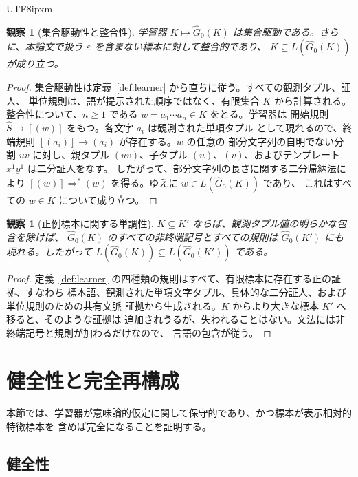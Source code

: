 \documentclass[10pt,a4paper]{article}
\newtheorem{observation}[theorem]{観察}
\theoremstyle{remark}
\newcommand{\eps}{\varepsilon}
\begin{document}
\begin{CJK}{UTF8}{ipxm}
\begin{observation}[集合駆動性と整合性]
\label{obs:set-driven-consistent}
学習器 \(K\mapsto\widehat G_0(K)\) は集合駆動である。さらに、本論文で扱う
\(\eps\) を含まない標本に対して整合的であり、
\(K\subseteq L(\widehat G_0(K))\) が成り立つ。
\end{observation}

\begin{proof}
集合駆動性は定義~\ref{def:learner} から直ちに従う。すべての観測タプル、証人、
単位規則は、語が提示された順序ではなく、有限集合 \(K\) から計算される。
整合性について、\(n\ge1\) である \(w=a_1\cdots a_n\in K\) をとる。学習器は
開始規則 \(\widehat S\to[(w)]\) をもつ。各文字 \(a_i\) は観測された単項タプル
として現れるので、終端規則 \([(a_i)]\to(a_i)\) が存在する。\(w\) の任意の
部分文字列の自明でない分割 \(uv\) に対し、親タプル \((uv)\)、子タプル
\((u)\)、\((v)\)、およびテンプレート \(x^1y^1\) は二分証人をなす。
したがって、部分文字列の長さに関する二分帰納法により
\([(w)]\Rightarrow^*(w)\) を得る。ゆえに \(w\in L(\widehat G_0(K))\) であり、
これはすべての \(w\in K\) について成り立つ。
\end{proof}

\begin{observation}[正例標本に関する単調性]
\label{obs:learner-monotone}
\(K\subseteq K'\) ならば、観測タプル値の明らかな包含を除けば、
\(\widehat G_0(K)\) のすべての非終端記号とすべての規則は
\(\widehat G_0(K')\) にも現れる。したがって
\(L(\widehat G_0(K))\subseteq L(\widehat G_0(K'))\) である。
\end{observation}

\begin{proof}
定義~\ref{def:learner} の四種類の規則はすべて、有限標本に存在する正の証拠、すなわち
標本語、観測された単項文字タプル、具体的な二分証人、および単位規則のための共有文脈
証拠から生成される。\(K\) からより大きな標本 \(K'\) へ移ると、そのような証拠は
追加されうるが、失われることはない。文法には非終端記号と規則が加わるだけなので、
言語の包含が従う。
\end{proof}

\section{健全性と完全再構成}
\label{sec:exact}

本節では、学習器が意味論的仮定に関して保守的であり、かつ標本が表示相対的特徴標本を
含めば完全になることを証明する。

\subsection{健全性}
\label{sec:soundness}


\end{CJK}
\end{document}
